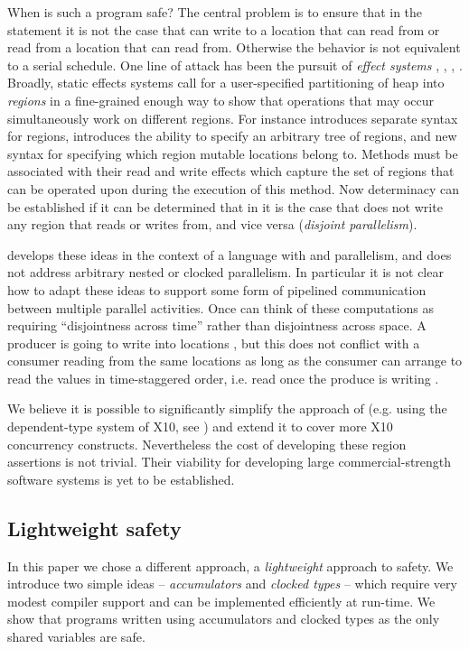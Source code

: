 When is such a program safe? The central problem
is to ensure that in the statement  it is not the
case that  can write to a location that  can read
from or read from a location that  can read from. Otherwise
the behavior is not equivalent to a serial schedule. One line of attack has been the pursuit
of {\em effect systems} \cite{Lucassen:1988:PES:73560.73564},
\cite{Leino:2002:UDG:543552.512559},
\cite{boyland:01interdependence},
\cite{DPJ}. Broadly, static effects systems call
for a user-specified partitioning of heap into {\em regions} in a
fine-grained enough way to show that operations that may occur
simultaneously work on different regions. For instance \cite{DPJ}
introduces separate syntax for regions, introduces the ability to
specify an arbitrary tree of regions, and new syntax for specifying
which region mutable locations belong to. Methods must be associated
with their read and write effects which capture the set of regions
that can be operated upon during the execution of this
method. Now determinacy can be established if it can be determined
that in  it is the case that  does
not write any region that  reads or writes from, and vice
versa ({\em disjoint parallelism}).

\cite{DPJ} develops these ideas in the context of a language with
 and  parallelism, and does not
address arbitrary nested or clocked parallelism.  In particular it is
not clear how to adapt these ideas to support some form of pipelined
communication between multiple parallel activities. Once can think of
these computations as requiring ``disjointness across time'' rather
than disjointness across space. A producer is going to write into
locations , but this does not
conflict with a consumer reading from the same locations as long as
the consumer can arrange to read the values in time-staggered order,
i.e. read  once the produce is writing .

We believe it is possible to significantly simplify the approach of
\cite{DPJ} (e.g.{} using the dependent-type system of X10, see
) and extend it to cover more X10 concurrency
constructs.  Nevertheless the cost of developing these region
assertions is not trivial. Their viability for developing large
commercial-strength software systems is yet to be established.

\subsection{Lightweight safety}
In this paper we chose a different approach, a {\em lightweight}
approach to safety. We introduce two simple ideas -- {\em
  accumulators} and {\em clocked types} -- which require very modest
compiler support and can be implemented efficiently at run-time. We
show that programs written using accumulators and clocked types
as the only shared variables are safe.

